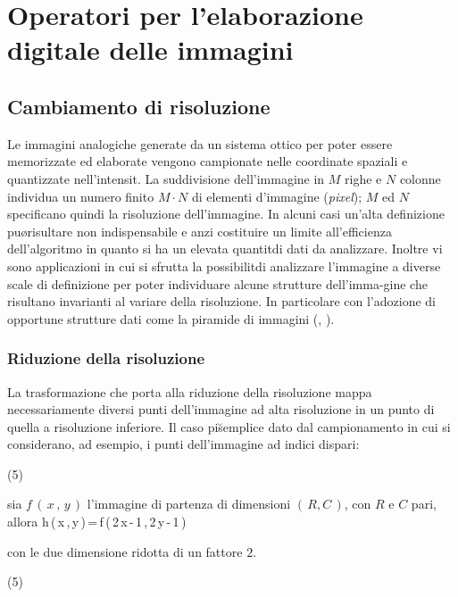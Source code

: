 \chapter{Operatori per l'elaborazione digitale delle immagini}

\section{Cambiamento di risoluzione}

Le immagini analogiche generate da un sistema ottico per poter essere memorizzate ed
elaborate vengono campionate nelle coordinate spaziali e quantizzate nell'intensit\a.
La suddivisione dell'immagine in $M$ righe e $N$ colonne individua un numero finito
$M \cdot N$ di elementi d'immagine ({\it pixel}); $M$ ed $N$ specificano quindi la risoluzione
dell'immagine.
In alcuni casi un'alta definizione pu\o risultare non indispensabile e anzi costituire
un limite all'efficienza dell'algoritmo in quanto si ha un elevata quantit\a di dati da
analizzare.
Inoltre vi sono applicazioni in cui si sfrutta la possibilit\a di analizzare l'immagine a
diverse scale di definizione per poter individuare alcune strutture dell'imma-gine che
risultano invarianti al variare della risoluzione.
In particolare con l'adozione di opportune strutture dati come la piramide di immagini 
(\cite{Zamperoni}, \cite{Meer}).

\subsection{Riduzione della risoluzione}

La trasformazione che porta alla riduzione della risoluzione mappa necessariamente diversi
punti dell'immagine ad alta risoluzione in un punto di quella a risoluzione inferiore.
Il caso pi\u semplice \e dato dal campionamento in cui si considerano, ad esempio, i punti
dell'immagine ad indici dispari:

\vs(5)

sia $f\,(\,x\,,\,y\,)$ l'immagine di partenza di dimensioni $(\,R,C\,)$, con $R$ e $C$
pari, allora  
\be
h\,(\,x\,,\,y\,)\,=\,f\,(\,2\,x\,-\,1\,,\,2\,y\,-\,1\,)
\ee

con le due dimensione ridotta di un fattore $2$. 

\vs (5)

